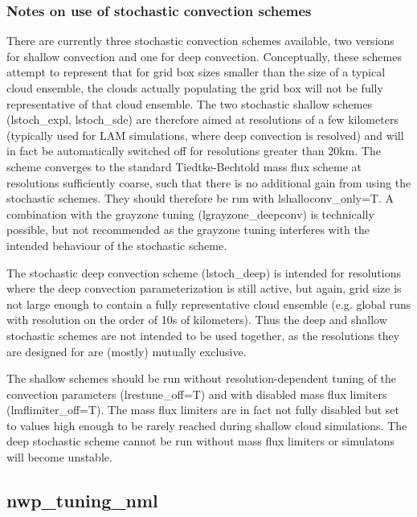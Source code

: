 \subsubsection{Notes on use of stochastic convection schemes}
There are currently three stochastic convection schemes available, two versions for shallow convection and one for deep convection. Conceptually, these schemes attempt to represent that for grid box sizes smaller than the size of a typical cloud ensemble, the clouds actually populating the grid box will not be fully representative of that cloud ensemble.
The two stochastic shallow schemes (lstoch\_expl, lstoch\_sde) are therefore aimed at resolutions of a few kilometers (typically used for LAM simulations, where deep convection is resolved) and will in fact be automatically switched off for resolutions greater than 20km. The scheme converges to the standard Tiedtke-Bechtold mass flux scheme at resolutions sufficiently coarse, such that there is no additional gain from using the stochastic schemes. They should therefore be run with lshalloconv\_only=T. A combination with the grayzone tuning (lgrayzone\_deepconv) is technically possible, but not recommended as the grayzone tuning interferes with the intended behaviour of the stochastic scheme.

The stochastic deep convection scheme (lstoch\_deep) is intended for resolutions where the deep convection parameterization is still active, but again, grid size is not large enough to contain a fully representative cloud ensemble (e.g. global runs with resolution on the order of 10s of kilometers). Thus the deep and shallow stochastic schemes are not intended to be used together, as the resolutions they are designed for are (mostly) mutually exclusive.

The shallow schemes should be run without resolution-dependent tuning of the convection parameters (lrestune\_off=T) and with disabled mass flux limiters (lmflimiter\_off=T). The mass flux limiters are in fact not fully disabled but set to values high enough to be rarely reached during shallow cloud simulations.
The deep stochastic scheme cannot be run without mass flux limiters or simulatons will become unstable.

\subsection{nwp\_tuning\_nml}

